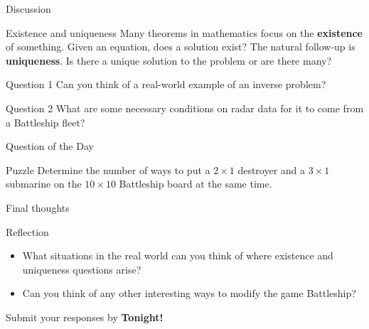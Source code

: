 \documentclass{beamer}
\begin{document}
\begin{frame}{Discussion}
\pause
  \begin{block}{Existence and uniqueness}
    Many theorems in mathematics focus on the \textbf{existence} of something.  Given an equation, does a solution exist?  The natural follow-up is \textbf{uniqueness}.  Is there a unique solution to the problem or are there many?
  \end{block}
\pause
  \begin{block}{Question 1}
    Can you think of a real-world example of an inverse problem?
  \end{block}
\pause
  \begin{block}{Question 2}
    What are some necessary conditions on radar data for it to come from a Battleship fleet?
  \end{block}
\end{frame}


\begin{frame}{Question of the Day}
\pause
  \begin{block}{Puzzle}
    Determine the number of ways to put a $2\times 1$ destroyer and a $3\times 1$ submarine on the $10\times 10$ Battleship board at the same time.
  \end{block}
\end{frame}

\begin{frame}{Final thoughts}
  \begin{block}{Reflection}
    \begin{itemize}
\pause
      \item What situations in the real world can you think of where existence and uniqueness questions arise?
\pause
      \item Can you think of any other interesting ways to modify the game Battleship?
    \end{itemize}
  \end{block}
\begin{center}
Submit your responses by \textbf{Tonight!}
\end{center}
\end{frame}
\end{document}
